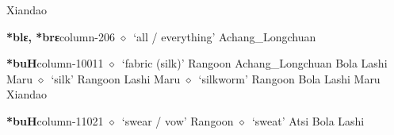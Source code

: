 \hspace{1ex}
         Xiandao 
  \item {\footnotesize \textbf{*blɛ, *brɛ}}{\tiny column-206}
         $\diamond$~`all / everything'
         Achang\_Longchuan 
  \item {\footnotesize \textbf{*buH}}{\tiny column-10011}
         $\diamond$~`fabric (silk)'
         Rangoon 
\hspace{1ex}
         Achang\_Longchuan 
\hspace{1ex}
         Bola 
\hspace{1ex}
         Lashi 
\hspace{1ex}
         Maru 
\hspace{1ex}
         $\diamond$~`silk'
         Rangoon 
\hspace{1ex}
         Lashi 
\hspace{1ex}
         Maru 
\hspace{1ex}
         $\diamond$~`silkworm'
         Rangoon 
\hspace{1ex}
         Bola 
\hspace{1ex}
         Lashi 
\hspace{1ex}
         Maru 
\hspace{1ex}
         Xiandao 
  \item {\footnotesize \textbf{*buH}}{\tiny column-11021}
         $\diamond$~`swear / vow'
         Rangoon 
\hspace{1ex}
         $\diamond$~`sweat'
         Atsi 
\hspace{1ex}
         Bola 
\hspace{1ex}
         Lashi 
\hspace{1ex}
